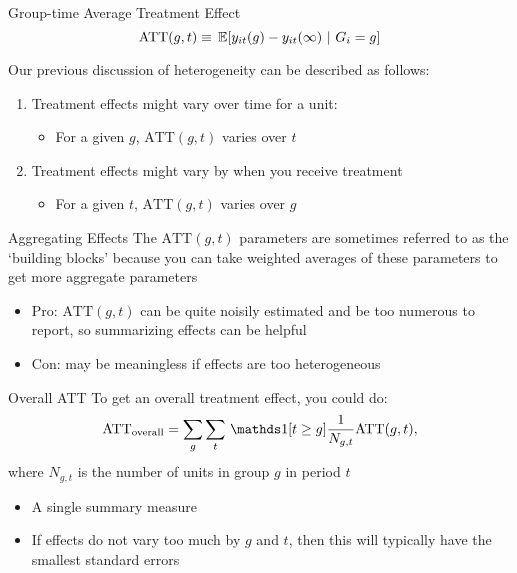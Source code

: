 \documentclass[aspectratio=169,t,11pt,table]{beamer}
\begin{document}
\begin{frame}{Group-time Average Treatment Effect}
  \vspace*{-\bigskipamount}
  $$
    \text{ATT}(g, t) \equiv \expec{y_{it}(g) - y_{it}(\infty)}{G_i = g}
  $$
  
  \bigskip
  Our previous discussion of heterogeneity can be described as follows:

  \bigskip
  \begin{enumerate}
    \item Treatment effects might vary over time for a unit:
    \begin{itemize}
      \item For a given $g$, $\text{ATT}(g, t)$ varies over $t$
    \end{itemize}
    
    \bigskip
    \item Treatment effects might vary by when you receive treatment
    \begin{itemize}
      \item For a given $t$, $\text{ATT}(g, t)$ varies over $g$
    \end{itemize}
  \end{enumerate}
\end{frame}

\begin{frame}{Aggregating Effects}
  The $\text{ATT}(g, t)$ parameters are sometimes referred to as the `building blocks' because you can take weighted averages of these parameters to get more aggregate parameters
  \begin{itemize}
    \item Pro: $\text{ATT}(g,t)$ can be quite noisily estimated and be too numerous to report, so summarizing effects can be helpful 
    
    \item Con: may be meaningless if effects are too heterogeneous
  \end{itemize}
\end{frame}

\begin{frame}{Overall ATT}
  To get an overall treatment effect, you could do:
  $$
    \text{ATT}_{\text{overall}} = \sum_{g} \sum_{t} \one{t \geq g} \frac{1}{N_{g,t}} \text{ATT}(g, t),
  $$
  where $N_{g,t}$ is the number of units in group $g$ in period $t$

  \pause
  \bigskip
  \begin{itemize}
    \item A single summary measure

    \item If effects do not vary too much by $g$ and $t$, then this will typically have the smallest standard errors
  \end{itemize}
\end{frame}
\end{document}
